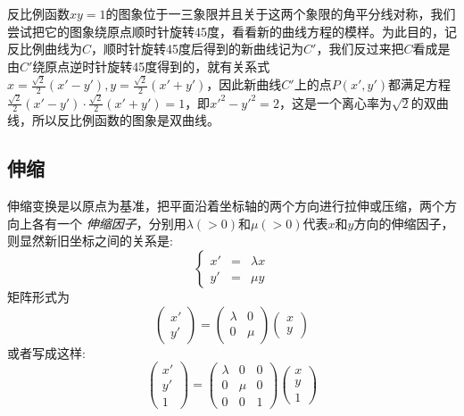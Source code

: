 \begin{example}
  反比例函数$xy=1$的图象位于一三象限并且关于这两个象限的角平分线对称，我们尝试把它的图象绕原点顺时针旋转45度，看看新的曲线方程的模样。为此目的，记反比例曲线为$C$，顺时针旋转45度后得到的新曲线记为$C'$，我们反过来把$C$看成是由$C'$绕原点逆时针旋转45度得到的，就有关系式$x=\frac{\sqrt{2}}{2}(x'-y'), y=\frac{\sqrt{2}}{2}(x'+y')$，因此新曲线$C'$上的点$P(x',y')$都满足方程$\frac{\sqrt{2}}{2}(x'-y') \cdot \frac{\sqrt{2}}{2}(x'+y')=1$，即$x'^2-y'^2=2$，这是一个离心率为$\sqrt{2}$的双曲线，所以反比例函数的图象是双曲线。
\end{example}

\subsection{伸缩}

伸缩变换是以原点为基准，把平面沿着坐标轴的两个方向进行拉伸或压缩，两个方向上各有一个 \emph{伸缩因子}，分别用$\lambda(>0)$和$\mu(>0)$代表$x$和$y$方向的伸缩因子，则显然新旧坐标之间的关系是:
\begin{equation}
  \label{eq:scale-translation-coordinate-formula}
  \left\{
    \begin{array}{ccc}
      x' & = & \lambda x \\
      y' & = & \mu y
    \end{array}
  \right.
\end{equation}
矩阵形式为
\begin{equation*}
  \left(
    \begin{array}{c}
      x' \\
      y'
    \end{array}
  \right)
    =
    \left(
      \begin{array}{cc}
        \lambda & 0 \\
        0 & \mu
      \end{array}
    \right)
  \left(
    \begin{array}{c}
      x \\
      y
    \end{array}
  \right)
\end{equation*}
或者写成这样:
\begin{equation*}
  \label{eq:scale-translation-coordinate-formula-matrix}
  \left(
    \begin{array}{c}
      x' \\
      y' \\
      1
    \end{array}
  \right)
    =
    \left(
      \begin{array}{ccc}
        \lambda & 0 & 0 \\
        0 & \mu & 0 \\
        0 & 0 & 1
      \end{array}
    \right)
  \left(
    \begin{array}{c}
      x \\
      y \\
      1
    \end{array}
  \right)
\end{equation*}

